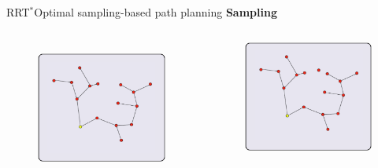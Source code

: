 \begin{frame}{RRT$^{*}$}{Optimal sampling-based path planning}
{\Large \textbf{Sampling}}
\begin{columns}
	\begin{figure}
		\centering
		\includegraphics[width=\linewidth]{figure/RRTs00.png}
		\label{fig:rrts:00}
	\end{figure}
	\begin{figure}
		\centering
		\includegraphics[width=\linewidth]{figure/RRTs01.png}

\end{figure}
\end{columns}
\end{frame}

